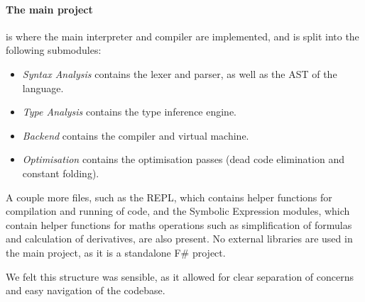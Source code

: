 \paragraph{The main project} is where the main interpreter and compiler are implemented, and is split into the following
submodules:
\begin{itemize}
    \item \textit{Syntax Analysis} contains the lexer and parser, as well as the AST of the language.
    \item \textit{Type Analysis} contains the type inference engine.
    \item \textit{Backend} contains the compiler and virtual machine.
    \item \textit{Optimisation} contains the optimisation passes (dead code elimination and constant folding).
\end{itemize}
A couple more files, such as the REPL, which contains helper functions for compilation and running of code, and the
Symbolic Expression modules, which contain helper functions for maths operations such as simplification of formulas 
and calculation of derivatives, are also present.
No external libraries are used in the main project, as it is a standalone F\# project.

We felt this structure was sensible, as it allowed for clear separation of concerns and easy navigation of the codebase.

